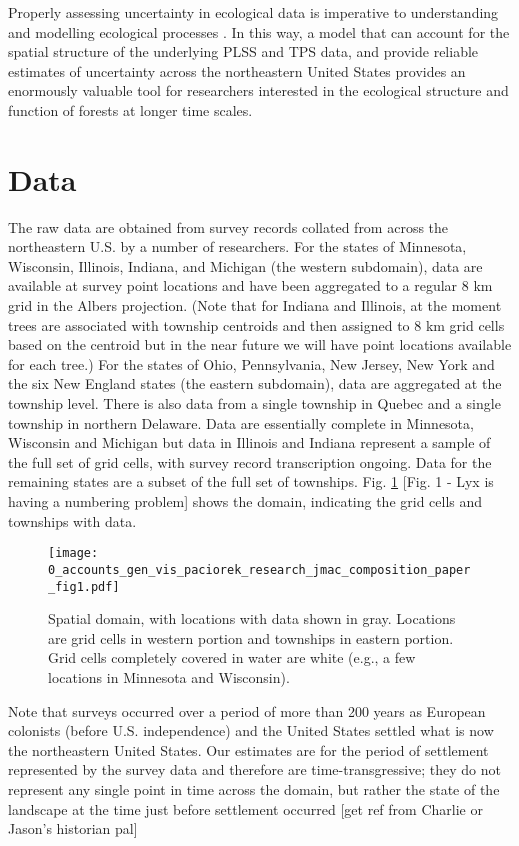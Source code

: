 \documentclass[12pt]{article}\usepackage[]{graphicx}\usepackage[]{color}
\begin{document}
Properly assessing uncertainty in ecological data is imperative to
understanding and modelling ecological processes \citep{cressie2009accounting}.
In this way, a model that can account for the spatial structure of
the underlying PLSS and TPS data, and provide reliable estimates of
uncertainty across the northeastern United States provides an enormously
valuable tool for researchers interested in the ecological structure
and function of forests at longer time scales.


\section{Data}

The raw data are obtained from survey records collated from across
the northeastern U.S. by a number of researchers. For the states of
Minnesota, Wisconsin, Illinois, Indiana, and Michigan (the western
subdomain), data are available at survey point locations and have
been aggregated to a regular 8 km grid in the Albers projection. (Note
that for Indiana and Illinois, at the moment trees are associated
with township centroids and then assigned to 8 km grid cells based
on the centroid but in the near future we will have point locations
available for each tree.) For the states of Ohio, Pennsylvania, New
Jersey, New York and the six New England states (the eastern subdomain),
data are aggregated at the township level. There is also data from
a single township in Quebec and a single township in northern Delaware.
Data are essentially complete in Minnesota, Wisconsin and Michigan
but data in Illinois and Indiana represent a sample of the full set
of grid cells, with survey record transcription ongoing. Data for
the remaining states are a subset of the full set of townships. Fig.
\ref{fig:domain} {[}Fig. 1 - Lyx is having a numbering problem{]}
shows the domain, indicating the grid cells and townships with data.

\begin{figure}
\label{fig:domain}\texttt{[image: 0\_accounts\_gen\_vis\_paciorek\_research\_jmac\_composition\_paper\_fig1.pdf]}

\caption{Spatial domain, with locations with data shown in gray. Locations
are grid cells in western portion and townships in eastern portion.
Grid cells completely covered in water are white (e.g., a few locations
in Minnesota and Wisconsin).}
\end{figure}


Note that surveys occurred over a period of more than 200 years as
European colonists (before U.S. independence) and the United States
settled what is now the northeastern United States. Our estimates
are for the period of settlement represented by the survey data and
therefore are time-transgressive; they do not represent any single
point in time across the domain, but rather the state of the landscape
at the time just before settlement occurred {[}get ref from Charlie
or Jason's historian pal{]}
\end{document}
